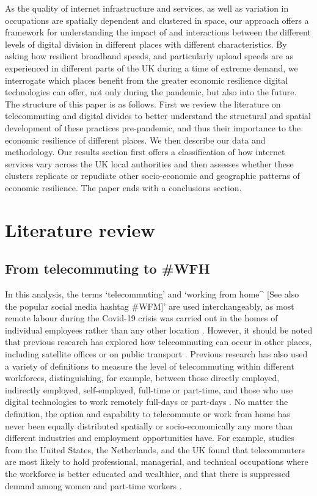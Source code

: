 \documentclass[Royal,times,sageh]{sagej}
\begin{document}
As the quality of internet infrastructure and services, as well as
variation in occupations are spatially dependent and clustered in space,
our approach offers a framework for understanding the impact of and
interactions between the different levels of digital division in
different places with different characteristics. By asking how resilient
broadband speeds, and particularly upload speeds are as experienced in
different parts of the UK during a time of extreme demand, we
interrogate which places benefit from the greater economic resilience
digital technologies can offer, not only during the pandemic, but also
into the future. The structure of this paper is as follows. First we
review the literature on telecommuting and digital divides to better
understand the structural and spatial development of these practices
pre-pandemic, and thus their importance to the economic resilience of
different places. We then describe our data and methodology. Our results
section first offers a classification of how internet services vary
across the UK local authorities and then assesses whether these clusters
replicate or repudiate other socio-economic and geographic patterns of
economic resilience. The paper ends with a conclusions section.

\hypertarget{sec:2}{%
\section{Literature review}\label{sec:2}}

\hypertarget{sec:2.1}{%
\subsection{From telecommuting to \#WFH}\label{sec:2.1}}

In this analysis, the terms `telecommuting' and `working from home\^{}
{[}See also the popular social media hashtag \#WFM{]}' are used
interchangeably, as most remote labour during the Covid-19 crisis was
carried out in the homes of individual employees rather than any other
location \citep{eurofound2020}. However, it should be noted that
previous research has explored how telecommuting can occur in other
places, including satellite offices or on public transport
\citep{felstead2012rapid, siha2006telecommuting}. Previous research has
also used a variety of definitions to measure the level of telecommuting
within different workforces, distinguishing, for example, between those
directly employed, indirectly employed, self-employed, full-time or
part-time, and those who use digital technologies to work remotely
full-days or part-days
\citep{allen2015effective, bailey2002review, haddad2009examination}. No
matter the definition, the option and capability to telecommute or work
from home has never been equally distributed spatially or
socio-economically any more than different industries and employment
opportunities have. For example, studies from the United States, the
Netherlands, and the UK found that telecommuters are most likely to hold
professional, managerial, and technical occupations where the workforce
is better educated and wealthier, and that there is suppressed demand
among women and part-time workers
\citep{headicar2016move, peters2004employees, singh2013modeling}.
\end{document}
